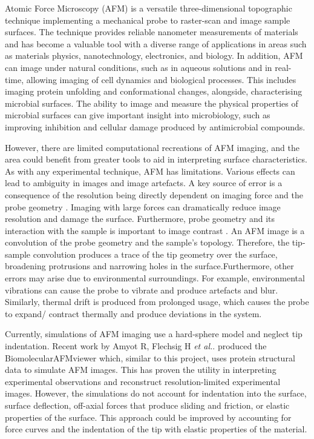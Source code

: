 Atomic Force Microscopy (AFM) is a versatile three-dimensional topographic technique implementing a mechanical probe to raster-scan and image sample surfaces. The technique provides reliable nanometer measurements of materials \cite{nagashima1996nanoscopic, kempf1998nanohardness,goken1999microstructural,yamamoto2000afm} and has become a valuable tool with a diverse range of applications in areas such as materials physics, nanotechnology, electronics, and biology\cite{JALILI2004907,SANTOS2004133, goken1999microstructural}. In addition, AFM can image under natural conditions, such as in aqueous solutions and in real-time, allowing imaging of cell dynamics and biological processes. This includes imaging protein unfolding \cite{hughes2016physics} and conformational changes\cite{moody2006atomic}, alongside, characterising microbial surfaces\cite{wright2006application,dufrene2004using}. The ability to image and measure the physical properties of microbial surfaces can give important insight into microbiology, such as improving inhibition and cellular damage produced by antimicrobial compounds\cite{wright2006application, TYAGI2010797}. 

However, there are limited computational recreations of AFM imaging, and the area could benefit from greater tools to aid in interpreting surface characteristics. As with any experimental technique, AFM has limitations. Various effects can lead to ambiguity in images and image artefacts. A key source of error is a consequence of the resolution being directly dependent on imaging force and the probe geometry \cite{dufrene2002atomic}. Imaging with large forces can dramatically reduce image resolution and damage the surface. Furthermore, probe geometry and its interaction with the sample is important to image contrast \cite{dufrene2002atomic}. An AFM image is a convolution of the probe geometry and the sample's topology. Therefore, the tip-sample convolution produces a trace of the tip geometry over the surface, broadening protrusions and narrowing holes in the surface.Furthermore, other errors may arise due to environmental surroundings. For example, environmental vibrations can cause the probe to vibrate and produce artefacts and blur. Similarly, thermal drift is produced from prolonged usage, which causes the probe to expand/ contract thermally and produce deviations in the system.

Currently, simulations of AFM imaging use a hard-sphere model and neglect tip indentation. Recent work by Amyot R, Flechsig H  \textit{et al.}. \cite{amyot2020bioafmviewer} produced the BiomolecularAFMviewer which, similar to this project, uses protein structural data to simulate AFM images. This has proven the utility in interpreting experimental observations and reconstruct resolution-limited experimental images\cite{amyot2022simulation}. However, the simulations do not account for indentation into the surface, surface deflection, off-axial forces that produce sliding and friction, or elastic properties of the surface. This approach could be improved by accounting for force curves and the indentation of the tip with elastic properties of the material. 

